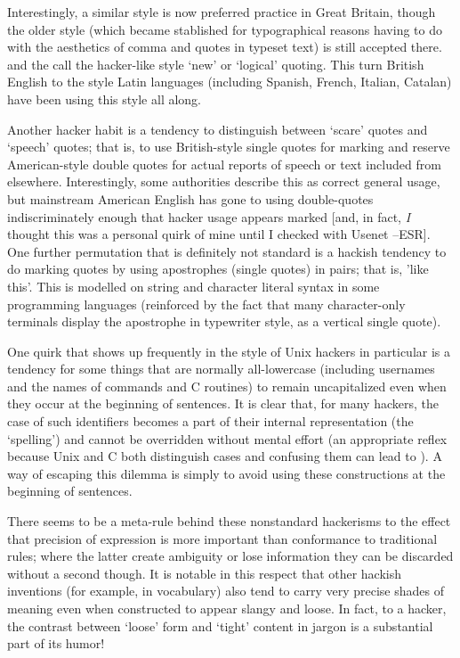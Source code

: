 Interestingly, a similar style is now preferred practice in Great Britain, though the older style (which became stablished for
typographical reasons having to do with the aesthetics of comma and quotes in typeset text) is still accepted there.
 and the  call the hacker-like style `new' or `logical'
quoting. This turn British English to the style Latin languages (including Spanish, French, Italian, Catalan) have been using this style
all along.

Another hacker habit is a tendency to distinguish between `scare' quotes and `speech' quotes; that is, to use British-style single quotes
for marking and reserve American-style double quotes for actual reports of speech or text included from elsewhere. Interestingly, some
authorities describe this as correct general usage, but mainstream American English has gone to using double-quotes indiscriminately
enough that hacker usage appears marked [and, in fact, \textit{I} thought this was a personal quirk of mine until I checked with Usenet
--ESR]. One further permutation that is definitely not standard is a hackish tendency to do marking quotes by using apostrophes (single
quotes) in pairs; that is, 'like this'. This is modelled on string and character literal syntax in some programming languages (reinforced
by the fact that many character-only terminals display the apostrophe in typewriter style, as a vertical single quote).

One quirk that shows up frequently in the  style of Unix hackers in particular is a tendency for some things that are
normally all-lowercase (including usernames and the names of commands and C routines) to remain uncapitalized even when they occur at the
beginning of sentences. It is clear that, for many hackers, the case of such identifiers becomes a part of their internal representation
(the `spelling') and cannot be overridden without mental effort (an appropriate reflex because Unix and C both distinguish cases and
confusing them can lead to ). A way of escaping this dilemma is simply to avoid using these constructions at the
beginning of sentences.

There seems to be a meta-rule behind these nonstandard hackerisms to the effect that precision of expression is more important than
conformance to traditional rules; where the latter create ambiguity or lose information they can be discarded without a second though. It
is notable in this respect that other hackish inventions (for example, in vocabulary) also tend to carry very precise shades of meaning
even when constructed to appear slangy and loose. In fact, to a hacker, the contrast between `loose' form and `tight' content in jargon is
a substantial part of its humor!

